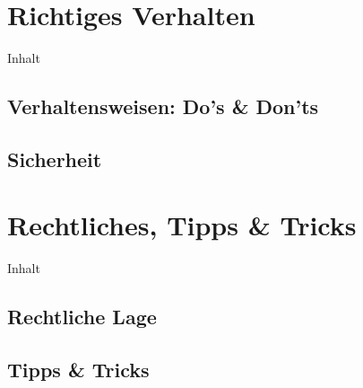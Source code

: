 \documentclass{beamer}
\begin{document}
			\begin{frame}{}
			\end{frame}
	
	\section{Richtiges Verhalten}
		
		\begin{frame}[t]{Inhalt}
		\end{frame}
		
		\subsection{Verhaltensweisen: Do's \& Don'ts}
			
			\begin{frame}{}
			\end{frame}
			
		\subsection{Sicherheit}
			
			\begin{frame}{}
			\end{frame}
	
	\section{Rechtliches, Tipps \& Tricks}
		
		\begin{frame}[t]{Inhalt}
		\end{frame}
	
		\subsection{Rechtliche Lage}
			
			\begin{frame}{}
			\end{frame}
		
		\subsection{Tipps \& Tricks}
\end{document}

